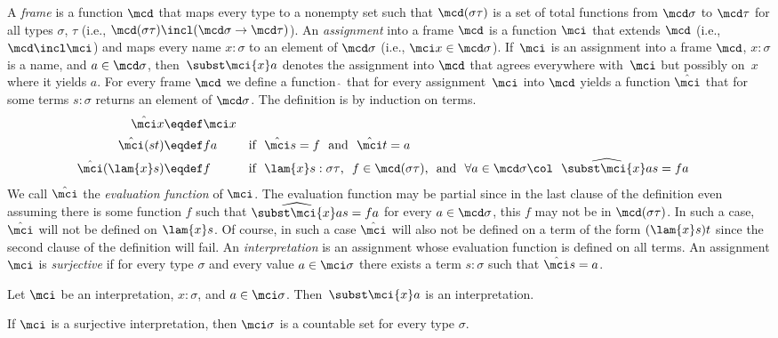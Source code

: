 A \emph{frame} is a function $\mcd$ that maps every
type to a nonempty set such that $\mcd(\sigma\tau)$ is
a set of total functions from $\mcd\sigma$ to
$\mcd\tau$ for all types $\sigma$, $\tau$ (i.e.,
$\mcd(\sigma\tau)\incl(\mcd\sigma\to\mcd\tau)$).
An
\emph{assignment} into a frame $\mcd$ is a function
$\mci$ that extends $\mcd$ (i.e., $\mcd\incl\mci$) and
maps every name $x:\sigma$ to an element of $\mcd\sigma$
(i.e., $\mci x\in\mcd\sigma$).  If~$\mci$ is an
assignment into a frame $\mcd$, $x:\sigma$ is a
name, and $a\in\mcd\sigma$,
then~\emph{$\subst\mci{x}a$} denotes the assignment
into $\mcd$ that agrees everywhere with~$\mci$ but
possibly on~$x$ where it yields $a$.  For every frame
$\mcd$ we define a function \emph{$\hat{~}$} that for
every assignment~$\mci$ into $\mcd$ yields a
function $\hat\mci$ that for some terms $s:\sigma$
returns an element of $\mcd\sigma$.  The definition is
by induction on terms.
\begin{align*}
  \hat\mci x&\eqdef\mci x \\
  \hat\mci(st)&\eqdef fa
  &&\text{if \ $\hat\mci s=f$ \ and \ $\hat\mci t=a$}  \\
  \hat\mci(\lam{x}s)&\eqdef f
  &&\text{if \ $\lam{x}s:\sigma\tau$, \ 
    $f\in\mcd(\sigma\tau)$, \ and \ 
    $\forall a\in\mcd\sigma\col~~
    \widehat{\subst\mci{x}a}s=fa$}  
\end{align*}
We call $\hat\mci$ the \emph{evaluation function} of
$\mci$.  
The evaluation function may be partial since in the last clause  of the definition even assuming there is some function $f$ such that $\widehat{\subst\mci{x}a}s=fa$ for every $a\in\mcd\sigma$, this $f$ may not be in $\mcd(\sigma\tau)$.  In such a case, $\hat\mci$ will not be defined on $\lam{x}s$.  Of course, in such a case $\hat\mci$ will also not be defined on a term of the form $(\lam{x}s)t$ since
the second clause of the definition will fail. An \emph{interpretation} is an
assignment whose evaluation function is defined on
all terms.  An assignment $\mci$ is
\emph{surjective} if for every type $\sigma$ and every
value $a\in\mci\sigma$ there exists a term $s:\sigma$
such that $\hat\mci s=a$.

\begin{prop}
  Let $\mci$ be an interpretation, $x:\sigma$,
  and $a\in\mci\sigma$.  Then~$\subst\mci{x}a$ is an
  interpretation.
\end{prop}



\begin{prop}
  If $\mci$ is a surjective interpretation, then
  $\mci\sigma$ is a countable set for every type
  $\sigma$.
\end{prop}

